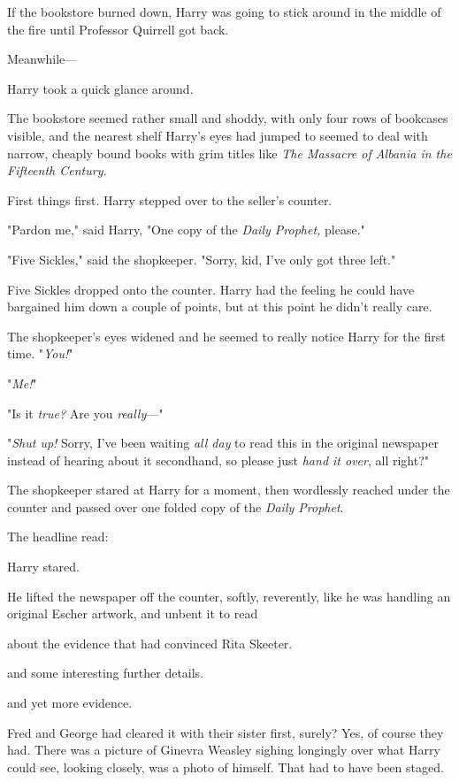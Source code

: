 If the bookstore burned down, Harry was going to stick around in the middle of
the fire until Professor Quirrell got back.

Meanwhile---

Harry took a quick glance around.

The bookstore seemed rather small and shoddy, with only four rows of bookcases
visible, and the nearest shelf Harry's eyes had jumped to seemed to deal with
narrow, cheaply bound books with grim titles like \emph{The Massacre of Albania
in the Fifteenth Century.}

First things first. Harry stepped over to the seller's counter.

"Pardon me," said Harry, "One copy of the \emph{Daily Prophet,} please."

"Five Sickles," said the shopkeeper. "Sorry, kid, I've only got three left."

Five Sickles dropped onto the counter. Harry had the feeling he could have
bargained him down a couple of points, but at this point he didn't really care.

The shopkeeper's eyes widened and he seemed to really notice Harry for the
first time. "\emph{You!}"

"\emph{Me!}"

"Is it \emph{true?} Are you \emph{really}\mbox{---}"

"\emph{Shut up!} Sorry, I've been waiting \emph{all day} to read this in the
original newspaper instead of hearing about it secondhand, so please just
\emph{hand it over}, all right?"

The shopkeeper stared at Harry for a moment, then wordlessly reached under the
counter and passed over one folded copy of the \emph{Daily Prophet}.

The headline read:


Harry stared.

He lifted the newspaper off the counter, softly, reverently, like he was
handling an original Escher artwork, and unbent it to read{\el}

{\el} about the evidence that had convinced Rita Skeeter.

{\el} and some interesting further details.

{\el} and yet more evidence.

Fred and George had cleared it with their sister first, surely? Yes, of course
they had. There was a picture of Ginevra Weasley sighing longingly over what
Harry could see, looking closely, was a photo of himself. That had to have been
staged.

